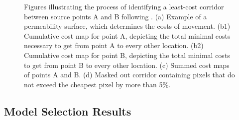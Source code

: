 \documentclass[abstract=on,10pt,a4paper,bibliography=totocnumbered]{scrartcl}
\begin{document}
\begin{figure}[hbtp]
\begin{center}
  \caption{Figures illustrating the process of identifying a least-cost corridor
  between source points A and B following \cite{Pinto.2009}. (a) Example of a
  permeability surface, which determines the costs of movement. (b1) Cumulative
  cost map for point A, depicting the total minimal costs necessary to get from
  point A to every other location. (b2) Cumulative cost map for point B,
  depicting the total minimal costs to get from point B to every other location.
  (c) Summed cost maps of points A and B. (d) Masked out corridor containing
  pixels that do not exceed the cheapest pixel by more than 5\%.}
  \label{LCCExample}
  \end{center}
\end{figure}

\newpage
\subsection{Model Selection Results}
\label{AICs}
\end{document}
